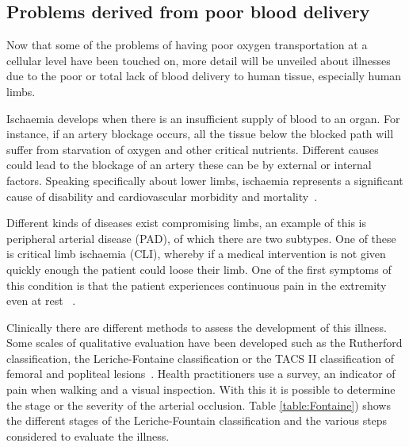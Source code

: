 \subsection{Problems derived from poor blood delivery} %
\label{section literature 4,1}
Now that some of the problems of having poor oxygen transportation at a cellular level have been touched on, more detail will be unveiled about illnesses due to the poor or total lack of blood delivery to human tissue, especially human limbs. 

Ischaemia develops when there is an insufficient supply of blood to an organ. For instance, if an artery blockage occurs, all the tissue below the blocked path will suffer from starvation of oxygen and other critical nutrients. Different causes could lead to the blockage of an artery these can be by external or internal factors. Speaking specifically about lower limbs, ischaemia represents a significant cause of disability and cardiovascular morbidity and mortality~\cite{novo1995patients}.

Different kinds of diseases exist compromising limbs, an example of this is peripheral arterial disease (PAD), of which there are two subtypes. One of these is critical limb ischaemia (CLI), whereby if a medical intervention is not given quickly enough the patient could loose their limb. One of the first symptoms of this condition is that the patient experiences continuous pain in the extremity even at rest ~\cite{novo2004critical}. 

Clinically there are different methods to assess the development of this illness. Some scales of qualitative evaluation have been developed such as the Rutherford classification, the Leriche-Fontaine classification or the TACS II classification of femoral and popliteal lesions~\cite{norgren2007inter}. Health practitioners use a survey, an indicator of pain when walking and a visual inspection. With this it is possible to determine the stage or the severity of the arterial occlusion.  Table \ref{table:Fontaine}) shows the different stages of the Leriche-Fountain classification and the various steps considered to evaluate the illness.


